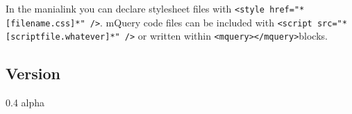 \documentclass[10pt,a4paper]{article}
\begin{document}
In the manialink you can declare stylesheet files with
\texttt{\textless{}style href="*{[}filename.css{]}*" /\textgreater{}}.
mQuery code files can be included with
\texttt{\textless{}script src="*{[}scriptfile.whatever{]}*" /\textgreater{}}
or written within
\texttt{\textless{}mquery\textgreater{}\textless{}/mquery\textgreater{}}blocks.

\subsection{Version}\label{version}

0.4 alpha
\end{document}
